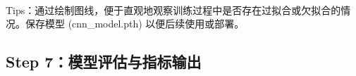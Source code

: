 \documentclass[11pt]{article}
\begin{document}
    \begin{center}
    \end{center}
    { \hspace*{\fill} \\}
    
    Tips：通过绘制图线，便于直观地观察训练过程中是否存在过拟合或欠拟合的情况。保存模型
(cnn\_model.pth) 以便后续使用或部署。

    \hypertarget{step-7ux6a21ux578bux8bc4ux4f30ux4e0eux6307ux6807ux8f93ux51fa}{%
\subsection{Step
7：模型评估与指标输出}\label{step-7ux6a21ux578bux8bc4ux4f30ux4e0eux6307ux6807ux8f93ux51fa}}
\end{document}

